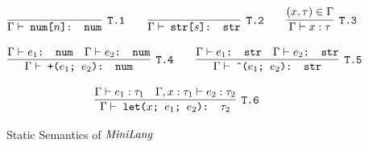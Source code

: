 \begin{figure}[htb]
\[
\cinfer[T.1]{$\Gamma \vdash$ num[$n$]: num}{ }
\qquad
\cinfer[T.2]{$\Gamma \vdash$ str[$s$]: str}{ }
\qquad
\infer[T.3]{\Gamma \vdash x: \tau}{(x, \tau) \in \Gamma}
\]

\[
\cinfer[T.4]{$\Gamma \vdash$ +($e_1$; $e_2$): num}
  {\code{$\Gamma \vdash e_1$: num} & \code{$\Gamma \vdash e_2$: num}}
\qquad
\cinfer[T.5]{$\Gamma \vdash$ \^{}($e_1$; $e_2$): str}
  {\code{$\Gamma \vdash e_1$: str} & \code{$\Gamma \vdash e_2$: str}}
\]

\[
\cinfer[T.6]{$\Gamma \vdash$ let($x$; $e_1$; $e_2$): $\tau_2$}
  {\Gamma \vdash e_1: \tau_1
   &
   \Gamma , x : \tau_1 \vdash e_2 : \tau_2
  }
\]
\caption{Static Semantics of $\mathit{MiniLang}$}
\label{fig:type_rules} 
\end{figure}